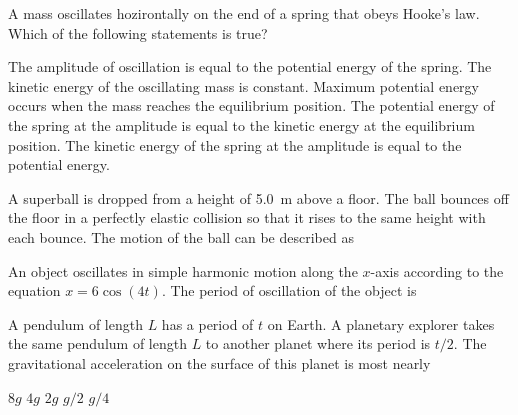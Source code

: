 \documentclass{../../oss-apphys-exam}
\begin{document}



\raggedcolumns
\begin{multicols*}{2}
  \begin{questions}
    \question A mass oscillates hozirontally on the end of a spring that obeys
    Hooke's law. Which of the following statements is true?
    \begin{choices}
      \choice The amplitude of oscillation is equal to the potential energy of
      the spring.
      \choice The kinetic energy of the oscillating mass is constant.
      \choice Maximum potential energy occurs when the mass reaches the
      equilibrium position.
      \choice The potential energy of the spring at the amplitude is equal to
      the kinetic energy at the equilibrium position.
      \choice The kinetic energy of the spring at the amplitude is equal to the
      potential energy.
    \end{choices}
    \vspace{.55in}
    
    \question A superball is dropped from a height of \SI{5.0}{\metre} above a
    floor. The ball bounces off the floor in a perfectly elastic collision so
    that it rises to the same height with each bounce. The motion of the ball
    can be described as
    \vspace{.55in}
    
    \question An object oscillates in simple harmonic motion along the $x$-axis
    according to the equation $x=6\cos(4t)$. The period of oscillation of the
    object is

    \question A pendulum of length $L$ has a period of $t$ on Earth. A
    planetary explorer takes the same pendulum of length $L$ to another planet
    where its period is $t/2$. The gravitational acceleration on the surface of
    this planet is most nearly
    \begin{choices}
      \choice $8g$
      \choice $4g$
      \choice $2g$
      \choice $g/2$
      \choice $g/4$
    \end{choices}
    \columnbreak


\end{questions}
\end{multicols*}
\end{document}
